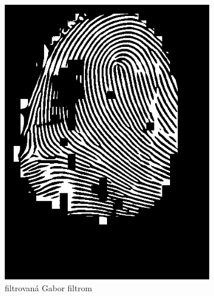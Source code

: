 \begin{figure}[h]
\begin{subfigure}[b]{0.3\linewidth}
      \includegraphics[width=\linewidth]{obrazky-figures/ecsema_gabor.png}
      \caption{filtrovaná Gabor filtrom}
      \label{obr:ecsema_gabor}
    \end{subfigure}
    \hfill
    \begin{subfigure}[b]{0.3\linewidth}

\end{subfigure}
\end{figure}
